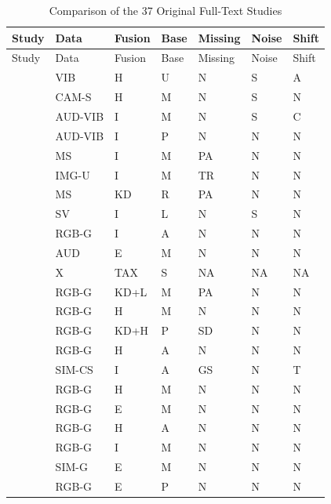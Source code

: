 \begin{longtable}{@{}p{}llllll@{}}
\caption{Comparison of the 37 Original Full-Text Studies}\label{tab:literature-matrix}\\
\toprule Study & Data & Fusion & Base & Missing & Noise & Shift \\
\midrule\endfirsthead
\toprule Study & Data & Fusion & Base & Missing & Noise & Shift \\
\midrule\endhead
\citep{Wang2025A} & VIB & H & U & N & S & A \\
\citep{Ying2025Trustworthy} & CAM-S & H & M & N & S & N \\
\citep{Huang2026Rolling} & AUD-VIB & I & M & N & S & C \\
\citep{Gu2024Improved} & AUD-VIB & I & P & N & N & N \\
\citep{Yang2024Fault} & MS & I & M & PA & N & N \\
\citep{Ma2025A} & IMG-U & I & M & TR & N & N \\
\citep{Li2025PGMTKD} & MS & KD & R & PA & N & N \\
\citep{AlDulaimi2019A} & SV & I & L & N & S & N \\
\citep{Li2025MADFlow} & RGB-G & I & A & N & N & N \\
\citep{Wan2024Pipeline} & AUD & E & M & N & N & N \\
\citep{Baltrusaitis2019Multimodal} & X & TAX & S & NA & NA & NA \\
\citep{Sui2026Incomplete} & RGB-G & KD+L & M & PA & N & N \\
\citep{Cheng2025Multimodal} & RGB-G & H & M & N & N & N \\
\citep{Xu2025ModalityResilient} & RGB-G & KD+H & P & SD & N & N \\
\citep{Shangguan2025CPIR} & RGB-G & H & A & N & N & N \\
\citep{Altinses2025Performance} & SIM-CS & I & A & GS & N & T \\
\citep{Wang2023Multimodal} & RGB-G & H & M & N & N & N \\
\citep{Horwitz2023Back} & RGB-G & E & M & N & N & N \\
\citep{Costanzino2024Multimodal} & RGB-G & H & A & N & N & N \\
\citep{Rudolph2023Asymmetric} & RGB-G & I & M & N & N & N \\
\citep{Bonfiglioli2023The} & SIM-G & E & M & N & N & N \\
\citep{Bergmann2022The} & RGB-G & E & P & N & N & N \\

\end{longtable}
